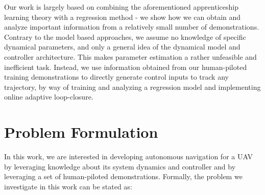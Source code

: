 \documentclass[letterpaper, 10 pt, conference]{ieeeconf}  %
\newcommand\NB[1]{$\spadesuit$\footnote{NB: #1}}
\begin{document}
Our work is largely based on combining the aforementioned apprenticeship learning theory with a regression method - we show how we can obtain and analyze important information from a relatively small number of demonstrations. Contrary to the model based approaches, we assume no knowledge of specific dynamical parameters, and only a general idea of the dynamical model and controller architecture. This makes parameter estimation a rather unfeasible and inefficient task. Instead, we use information obtained from our human-piloted training demonstrations to directly generate control inputs to track any trajectory, by way of training and analyzing a regression model and implementing online adaptive loop-closure.



\section{Problem Formulation}
In this work, we are interested in developing autonomous navigation for a UAV by leveraging knowledge about its system dynamics and controller and by leveraging a set of human-piloted demonstrations.
Formally, the problem we investigate in this work can be stated as:
\end{document}
